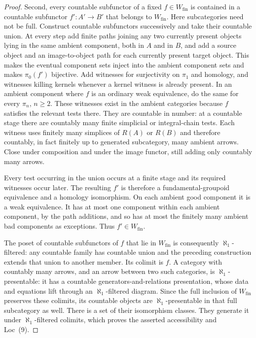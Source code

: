 \begin{proof}
Second, every countable subfunctor of a fixed $f\in W_{\mathrm{fin}}$
is contained in a countable subfunctor $f':A'\to B'$ that belongs to
$W_{\mathrm{fin}}$.  Here subcategories need not be full.  Construct
countable subfunctors successively and take their countable union.
At every step add finite paths joining any two currently present objects
lying in the same ambient component, both in $A$ and in $B$, and add a
source object and an image-to-object path for each currently present
target object.  This makes the eventual component sets inject into the
ambient component sets and makes $\pi_0(f')$ bijective.  Add witnesses
for surjectivity on $\pi_1$ and homology, and witnesses killing kernels
whenever a kernel witness is already present.  In an ambient component
where $f$ is an ordinary weak equivalence, do the same for every
$\pi_n$, $n\geq2$.  These witnesses exist in the ambient categories
because $f$ satisfies the relevant tests there.  They are countable in
number: at a countable stage there are countably many finite simplicial
or integral-chain tests.  Each witness uses finitely many simplices of
$R(A)$ or $R(B)$ and therefore countably, in fact finitely up to generated
subcategory, many ambient arrows.  Close under composition and under
the image functor, still adding only countably many arrows.

Every test occurring in the union occurs at a finite stage and its
required witnesses occur later.  The resulting $f'$ is therefore a
fundamental-groupoid equivalence and a homology isomorphism.  On each
ambient good component it is a weak equivalence.  It has at most one
component within each ambient component, by the path additions, and so
has at most the finitely many ambient bad components as exceptions.
Thus $f'\in W_{\mathrm{fin}}$.

The poset of countable subfunctors of $f$ that lie in
$W_{\mathrm{fin}}$ is consequently $\aleph_1$-filtered: any countable
family has countable union and the preceding construction extends that
union to another member.  Its colimit is $f$.  A category with countably
many arrows, and an arrow between two such categories, is
$\aleph_1$-presentable: it has a countable generators-and-relations
presentation, whose data and equations lift through an
$\aleph_1$-filtered diagram.  Since the full inclusion of
$W_{\mathrm{fin}}$ preserves these colimits, its countable objects are
$\aleph_1$-presentable in that full subcategory as well.  There is a set
of their isomorphism classes.  They generate it under
$\aleph_1$-filtered colimits, which proves the asserted accessibility
and Loc~(9).
\end{proof}

